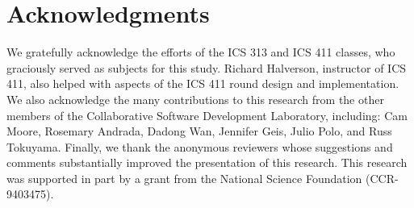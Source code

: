 \section{Acknowledgments} 

We gratefully acknowledge the efforts of the ICS 313 and ICS 411 classes,
who graciously served as subjects for this study.  Richard Halverson,
instructor of ICS 411, also helped with aspects of the ICS 411 round design
and implementation.  We also acknowledge the many
contributions to this research from the other members of the Collaborative
Software Development Laboratory, including: Cam Moore, Rosemary Andrada,
Dadong Wan, Jennifer Geis, Julio Polo, and Russ Tokuyama. Finally, we 
thank the anonymous reviewers whose suggestions and comments substantially
improved the presentation of this research.
This research was supported
in part by a grant  from the National Science Foundation (CCR-9403475).






